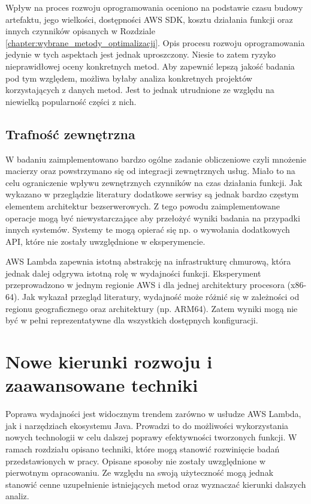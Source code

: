Wpływ na proces rozwoju oprogramowania oceniono na podstawie czasu budowy artefaktu, jego wielkości, dostępności AWS SDK, kosztu działania funkcji oraz innych czynników opisanych w Rozdziale \ref{chapter:wybrane_metody_optimalizacji}.
Opis procesu rozwoju oprogramowania jedynie w tych aspektach jest jednak uproszczony.
Niesie to zatem ryzyko nieprawidłowej oceny konkretnych metod.
Aby zapewnić lepszą jakość badania pod tym względem, możliwa byłaby analiza konkretnych projektów korzystających z danych metod.
Jest to jednak utrudnione ze względu na niewielką popularność części z nich.

\subsection*{Trafność zewnętrzna}

W badaniu zaimplementowano bardzo ogólne zadanie obliczeniowe czyli mnożenie macierzy oraz powstrzymano się od integracji zewnętrznych usług.
Miało to na celu ograniczenie wpływu zewnętrznych czynników na czas działania funkcji.
Jak wykazano w przeglądzie literatury dodatkowe serwisy są jednak bardzo częstym elementem architektur bezserwerowych.
Z tego powodu zaimplementowane operacje mogą być niewystarczające aby przełożyć wyniki badania na przypadki innych systemów.
Systemy te mogą opierać się np. o wywołania dodatkowych API, które nie zostały uwzględnione w eksperymencie.

AWS Lambda zapewnia istotną abstrakcję na infrastrukturę chmurową, która jednak dalej odgrywa istotną rolę w wydajności funkcji.
Eksperyment przeprowadzono w jednym regionie AWS i dla jednej architektury procesora (x86-64). 
Jak wykazał przegląd literatury, wydajność może różnić się w zależności od regionu geograficznego oraz architektury (np. ARM64). 
Zatem wyniki mogą nie być w pełni reprezentatywne dla wszystkich dostępnych konfiguracji.

\section{Nowe kierunki rozwoju i zaawansowane techniki}

Poprawa wydajności jest widocznym trendem zarówno w usłudze AWS Lambda, jak i narzędziach ekosystemu Java.
Prowadzi to do możliwości wykorzystania nowych technologii w celu dalszej poprawy efektywności tworzonych funkcji.
W ramach rozdziału opisano techniki, które mogą stanowić rozwinięcie badań przedstawionych w pracy.
Opisane sposoby nie zostały uwzględnione w pierwotnym opracowaniu. 
Ze względu na swoją użyteczność mogą jednak stanowić cenne uzupełnienie istniejących metod oraz wyznaczać kierunki dalszych analiz.

